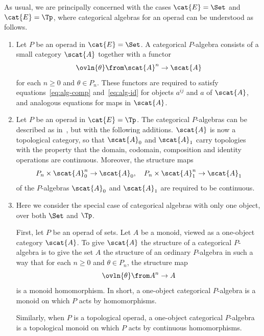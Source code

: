 As usual, we are principally concerned with the cases $\cat{E} = \Set$ and
$\cat{E} = \Tp$, where categorical algebras for an operad can be
understood as follows.
% 
\begin{examples}
\begin{enumerate}
\item 
{}
Let $P$ be an operad in $\cat{E} = \Set$.  A categorical $P$-algebra
consists of a small category $\scat{A}$ together with a functor
\[
\ovln{\theta} \from \scat{A}^n \to \scat{A}
\]
for each $n \geq 0$ and $\theta \in P_n$.  These functors are required to
satisfy equations~\eqref{eq:alg-comp} and~\eqref{eq:alg-id} for objects
$a^{ij}$ and $a$ of $\scat{A}$, and analogous equations for maps in
$\scat{A}$.

\item
{}
Let $P$ be an operad%
%
%
% 
in $\cat{E} = \Tp$.  The categorical $P$-algebras can be described as
in~, but with the following additions.  $\scat{A}$
is now a topological category, so that $\scat{A}_0$ and $\scat{A}_1$ carry
topologies with the property that the domain, codomain, composition and
identity operations are continuous.  Moreover, the structure maps
\[
P_n \times \scat{A}_0^n \to \scat{A}_0,
\quad
P_n \times \scat{A}_1^n \to \scat{A}_1
\]
of the $P$-algebras $\scat{A}_0$ and $\scat{A}_1$ are required to be
continuous. 

\item
{} 
% 
Here we consider the special case of categorical algebras with only one%
%
% 
object, over both $\Set$ and $\Tp$.

First, let $P$ be an operad of sets.  Let $A$ be a monoid, viewed as a
one-object category $\scat{A}$.  To give $\scat{A}$ the structure of a
categorical $P$-algebra is to give the set $A$ the structure of an ordinary
$P$-algebra in such a way that for each $n \geq 0$ and $\theta \in P_n$,
the structure map
\[
\ovln{\theta} \from A^n \to A
\]
is a monoid homomorphism.  In short, a one-object categorical $P$-algebra
is a monoid on which $P$ acts by homomorphisms.

Similarly, when $P$ is a topological operad, a one-object categorical
$P$-algebra is a topological monoid on which $P$ acts by continuous
homomorphisms. 
\end{enumerate}
\end{examples}

